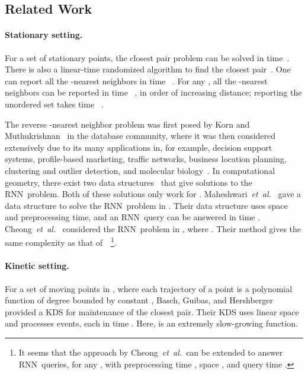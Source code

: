\documentclass[preprint,12pt]{elsarticle}
\def\rknn{\mbox{RNN}}
\def\r1nn{\mbox{RNN}}
\newcommand{\etal}{\emph{et~al.}}
\begin{document}
\subsection{Related Work}\label{sec:RelatedWork}
\paragraph{Stationary setting.} 
For a set  of  stationary points, the closest pair problem can be solved in  time~\cite{4567872,Bentley:1976:DMS:800113.803652}. There is also a linear-time randomized algorithm to find the closest pair~\cite{FSHJ1078}. One can report all the -nearest neighbors in time ~\cite{Vaidya:1989:ONL:70530.70532}. For any , all the -nearest neighbors can be reported in time ~\cite{Dickerson:1996:APP:236464.236474}, in order of increasing distance; reporting the unordered set takes time ~\cite{Callahan366854,Clarkson:1983:FAN:1382437.1382825,Dickerson:1996:APP:236464.236474}. 


The reverse -nearest neighbor problem was first posed by Korn and Muthukrishnan~\cite{Korn:2000:ISB:342009.335415}  in the database community, where it was then considered extensively due to its many applications in, for example, decision support systems, profile-based marketing, traffic networks, business location planning, clustering and outlier detection, and molecular biology~\cite{Kumar:2008:EAR:1463434.1463483,DBLP:conf/sdm/LinED08}. In computational geometry, there exist two data structures~\cite{MaheshwariVZ02cccg2002,CheongIJCGA2011} that give solutions to the \rknn~problem. Both of these solutions only work for . Maheshwari~\etal~\cite{MaheshwariVZ02cccg2002} gave a data structure to solve the \r1nn~problem in . Their data structure uses  space and  preprocessing time, and an \r1nn~query can be answered in time . Cheong~\etal~\cite{CheongIJCGA2011} considered the \r1nn~problem in , where . Their method gives the same complexity as that of~\cite{MaheshwariVZ02cccg2002}~\footnote{It seems that the approach by Cheong~\etal~can be extended to answer \rknn~queries, for any , with preprocessing time , space , and query time .}.

\paragraph{Kinetic setting.}
For a set of  moving points in , where each trajectory of a point is a polynomial function of degree bounded by constant , Basch, Guibas, and Hershberger~\cite{Basch:1997:DSM:314161.314435} provided a KDS for maintenance of the closest pair. Their KDS uses linear space and processes  events, each in time . Here,  is an extremely slow-growing function.
\end{document}

